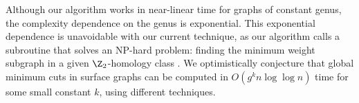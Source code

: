 Although our algorithm works in near-linear time for graphs of constant genus, the complexity dependence on the genus is exponential.  This exponential dependence is unavoidable with our current technique, as our algorithm calls a subroutine that solves an NP-hard problem: finding the minimum weight subgraph in a given $\Z_2$-homology class \cite{cen-mcshc-09}.  We optimistically conjecture that global minimum cuts in surface graphs can be computed in $O(g^k n \log\log n)$ time for some small constant $k$, using different techniques.